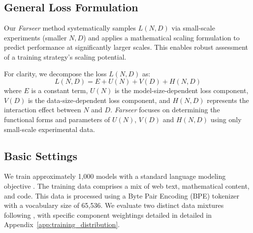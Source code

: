 \documentclass{article}
\begin{document}

\subsection{General Loss Formulation} \label{sec:general_loss_formulation}

Our \textit{Farseer} method systematically samples $L(N, D)$ via small-scale experiments (smaller $N, D$) and applies a mathematical scaling formulation to predict performance at significantly larger scales. This enables robust assessment of a training strategy's scaling potential.

For clarity, we decompose the loss $L(N, D)$ as:
\begin{equation} \label{eq:general_loss_form}
L(N, D) = E + U(N) + V(D) + H(N, D)
\end{equation}
where $E$ is a constant term, $U(N)$ is the model-size-dependent loss component, $V(D)$ is the data-size-dependent loss component, and $H(N, D)$ represents the interaction effect between $N$ and $D$. \textit{Farseer} focuses on determining the functional forms and parameters of $U(N)$, $V(D)$ and $H(N, D)$ using only small-scale experimental data.


\subsection{Basic Settings}
\label{sec:basic}
We train approximately 1,000 models with a standard language modeling objective \cite{vaswani2017attention,devlin2019bert,radford2018improving}. 
The training data comprises a mix of web text, mathematical content, and code. 
This data is processed using a Byte Pair Encoding (BPE) \cite{Gage1994ANA} tokenizer with a vocabulary size of 65,536. 
We evaluate two distinct data mixtures following \cite{Touvron2023a,li2025predictable}, with specific component weightings detailed in detailed in Appendix~\ref{app:training_distribution}.
\end{document}
